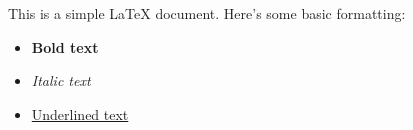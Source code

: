 This is a simple LaTeX document. Here's some basic formatting:

\begin{itemize}
    \item \textbf{Bold text}
    \item \textit{Italic text}
    \item \underline{Underlined text}
\end{itemize}